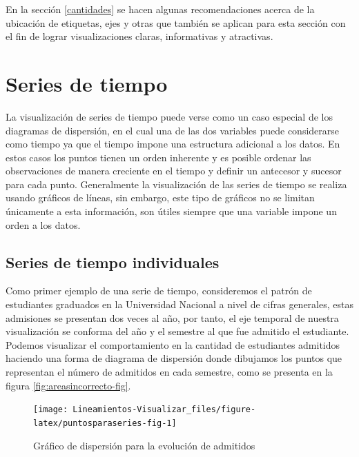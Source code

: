 \documentclass[
]{book}
\begin{document}
En la sección \ref{cantidades} se hacen algunas recomendaciones acerca de la ubicación de etiquetas, ejes y otras que también se aplican para esta sección con el fin de lograr visualizaciones claras, informativas y atractivas.

\hypertarget{series-de-tiempo}{%
\section{Series de tiempo}\label{series-de-tiempo}}

La visualización de series de tiempo puede verse como un caso especial de los diagramas de dispersión, en el cual una de las dos variables puede considerarse como tiempo ya que el tiempo impone una estructura adicional a los datos. En estos casos los puntos tienen un orden inherente y es posible ordenar las observaciones de manera creciente en el tiempo y definir un antecesor y sucesor para cada punto. Generalmente la visualización de las series de tiempo se realiza usando gráficos de líneas, sin embargo, este tipo de gráficos no se limitan únicamente a esta información, son útiles siempre que una variable impone un orden a los datos.

\hypertarget{series-de-tiempo-individuales}{%
\subsection{Series de tiempo individuales}\label{series-de-tiempo-individuales}}

Como primer ejemplo de una serie de tiempo, consideremos el patrón de estudiantes graduados en la Universidad Nacional a nivel de cifras generales, estas admisiones se presentan dos veces al año, por tanto, el eje temporal de nuestra visualización se conforma del año y el semestre al que fue admitido el estudiante. Podemos visualizar el comportamiento en la cantidad de estudiantes admitidos haciendo una forma de diagrama de dispersión donde dibujamos los puntos que representan el número de admitidos en cada semestre, como se presenta en la figura \ref{fig:areasincorrecto-fig}.

\begin{figure}

{\centering \texttt{[image: Lineamientos-Visualizar\_files/figure-latex/puntosparaseries-fig-1]} 

}

\caption{Gráfico de dispersión para la evolución de admitidos}\label{fig:puntosparaseries-fig}
\end{figure}
\end{document}
